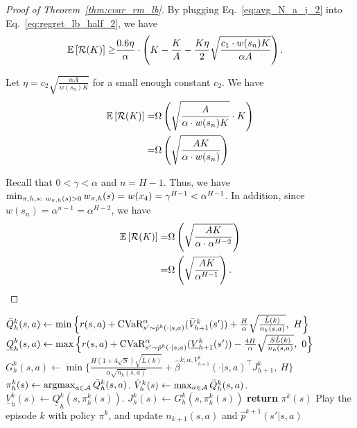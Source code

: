 \begin{proof}[Proof of Theorem~\ref{thm:cvar_rm_lb}]
	By plugging Eq.~\eqref{eq:avg_N_a_j_2} into Eq.~\eqref{eq:regret_lb_half_2}, we have
	\begin{align*}
		\mathbb{E} \left[ \mathcal{R}(K) \right] 
		\geq & \frac{0.6 \eta}{\alpha} \cdot  \left( K - \frac{K}{A} - \frac{K \eta}{2} \sqrt{ \frac{c_1 \cdot w(s_n) K}{\alpha A}  }   \right) .
	\end{align*}
	
	Let $\eta=c_2\sqrt{\frac{\alpha A}{w(s_n) K}}$ for a small enough constant $c_2$. We have
	\begin{align*}
		\mathbb{E} \left[ \mathcal{R}(K) \right] 
		= & \Omega \left(  \sqrt{\frac{A}{\alpha \cdot w(s_n) K}} \cdot K  \right)
		\\
		= & \Omega \left(  \sqrt{\frac{AK}{\alpha \cdot w(s_n) }}  \right) 
	\end{align*}
	
	Recall that $0<\gamma<\alpha$ and $n=H-1$. Thus, we have $\min_{\begin{subarray}{c}\pi,h,s:\  w_{\pi,h}(s)>0\end{subarray}} w_{\pi,h}(s)=w(x_4)=\gamma^{H-1}<\alpha^{H-1}$. In addition, since $w(s_n)=\alpha^{n-1}=\alpha^{H-2}$, we have
	\begin{align*}
		\mathbb{E} \left[ \mathcal{R}(K) \right] 
		= & \Omega \left(  \sqrt{\frac{AK}{\alpha \cdot \alpha^{H-2}} }  \right)
		\\
		= & \Omega \left(  \sqrt{\frac{AK}{ \alpha^{H-1}} }  \right) .
	\end{align*}
	
\end{proof}

\begin{algorithm}[t]
	\caption{$\algcvarbpi$} \label{alg:cvarbpi}
	{
		{
			{
				{
					$\bar{Q}^k_h(s,a) \leftarrow \min \Big\{ r(s,a)+\textup{CVaR}^{\alpha}_{s' \sim \hat{p}^k(\cdot|s,a)}(\bar{V}^k_{h+1}(s')) + \frac{H}{\alpha}\sqrt{\frac{\tilde{L}(k)}{n_k(s,a)}},\ H \Big\}$\;
					$\underline{Q}^k_h(s,a) \leftarrow \max \Big\{r(s,a)+\textup{CVaR}^{\alpha}_{s' \sim \hat{p}^k(\cdot|s,a)}(\underline{V}^k_{h+1}(s')) - \frac{4H}{\alpha}\sqrt{\frac{S\tilde{L}(k)}{n_k(s,a)}},\ 0 \Big\}$\;
					$G^k_h(s,a) \leftarrow \min \Big\{ \frac{H(1+4\sqrt{S})\sqrt{\tilde{L}(k)}}{\alpha  \sqrt{n_k(s,a)}}+\hat{\beta}^{k;\alpha,\underline{V}^k_{h+1}}(\cdot|s,a)^\top J^k_{h+1},\ H \Big\}$\; \label{line:bpi_beta}
				}
				$\pi^k_h(s) \leftarrow \argmax_{a \in \cA} \bar{Q}^k_h(s,a)$.
				$\bar{V}^k_h(s) \leftarrow  \max_{a \in \mathcal{A}} \bar{Q}^k_h(s,a)$.
				$\underline{V}^k_h(s) \leftarrow   \underline{Q}^k_h(s,\pi^k_h(s))$.
				$J^k_h(s) \leftarrow  G^k_h(s,\pi^k_h(s))$\;
			}
		}
		{
			{\bfseries return} $\pi^k(s)$
		}
		\Else
		{
			Play the episode $k$ with policy $\pi^k$, and update $n_{k+1}(s,a)$ and $\hat{p}^{k+1}(s'|s,a)$
		}
	}
\end{algorithm}

